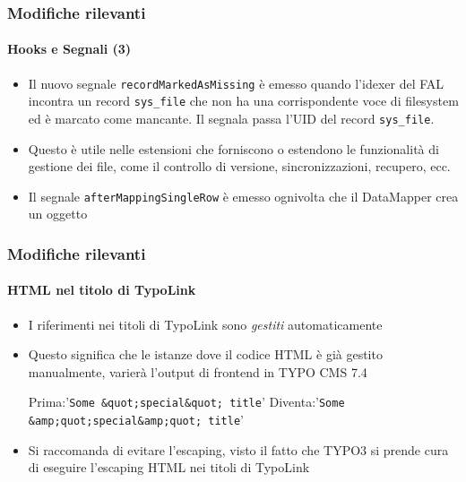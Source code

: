 \begin{frame}[fragile]
	\frametitle{Modifiche rilevanti}
	\framesubtitle{Hooks e Segnali (3)}

	\begin{itemize}

		\item Il nuovo segnale \texttt{recordMarkedAsMissing} è emesso quando l'idexer del FAL incontra un 
			record \texttt{sys\_file} che non ha una corrispondente voce di filesystem ed è marcato come 
			mancante. Il segnala passa l'UID del record \texttt{sys\_file}.

		\item Questo è utile nelle estensioni che forniscono o estendono le funzionalità di gestione dei file, come il controllo
			di versione, sincronizzazioni, recupero, ecc.

		\item Il segnale \texttt{afterMappingSingleRow} è emesso ognivolta che il DataMapper crea un oggetto

	\end{itemize}

\end{frame}


\begin{frame}[fragile]
	\frametitle{Modifiche rilevanti}
	\framesubtitle{HTML nel titolo di TypoLink}

	\lstset{basicstyle=\tiny\ttfamily}

	\begin{itemize}

		\item I riferimenti nei titoli di TypoLink sono \textit{gestiti} automaticamente
		\item Questo significa che le istanze dove il codice HTML è già gestito manualmente,
			varierà l'output di frontend in TYPO CMS 7.4

			Prima:\tabto{1.8cm}'\texttt{Some \&quot;special\&quot; title}'\newline
			Diventa:\tabto{1.8cm}'\texttt{Some \&amp;quot;special\&amp;quot; title}'

		\item Si raccomanda di evitare l'escaping, visto il fatto che TYPO3 si prende cura di eseguire l'escaping
			HTML nei titoli di TypoLink

	\end{itemize}

	\breakingchange

\end{frame}

